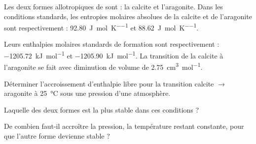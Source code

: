 \begin{exercise}

Les deux formes allotropiques de  sont : la calcite et l'aragonite. Dans les conditions standards, les entropies molaires absolues de la calcite et de l'aragonite sont respectivement : \SI{92.80}{\joule\per\mole\per\kelvin} et \SI{88.62}{\joule\per\mole\per\kelvin}.


Leurs enthalpies molaires standards de formation sont respectivement : \SI{-1205.72}{\kilo\joule\per\mole} et \SI{-1205.90}{\kilo\joule\per\mole}. La transition de la calcite à l'aragonite se fait avec diminution de volume de \SI{2.75}{\centi\meter\cubed\per\mole}.

\begin{questions}
    \question Déterminer l'accroissement d'enthalpie libre pour la transition calcite $\to$ aragonite à \SI{25}{\celsius} sous une pression d'une atmosphère.
    
    \question Laquelle des deux formes est la plus stable dans ces conditions ?
    
    \question De combien faut-il accroître la pression, la température restant constante, pour que l'autre forme devienne stable ?
\end{questions}
\end{exercise}